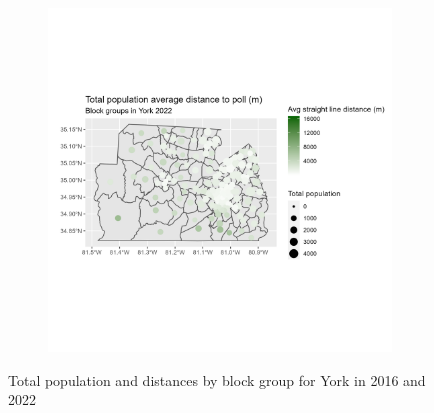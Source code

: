 \documentclass[11pt]{article}
\theoremstyle{remark}
\theoremstyle{definition}
\begin{document}
\begin{figure}
\begin{subfigure}{.5\textwidth}
		\includegraphics[width=\linewidth]{result_analysis/York_SC_original_configs/population_pop_and_dist_York_config_original_2022_polls.png}
		\label{sfig:York_2022_bg_dist}
	\end{subfigure}
	\caption{Total population and distances by block group for York in 2016 and 2022}
	\label{fig:York distance Total population maps}
\end{figure}
\end{document}
